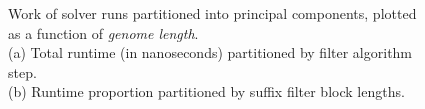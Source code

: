 \begin{figure}
\centering
{}
\caption[Work time of \aspop{} solver runs partitioned into principal components, plotted as a function of \textit{genome length}]{Work of \aspop{} solver runs partitioned into principal components, plotted as a function of \textit{genome length}.\\(a) Total runtime (in nanoseconds) partitioned by filter algorithm step.\\(b) Runtime proportion partitioned by suffix filter block lengths.}
\label{fig:gnmlen}
\end{figure}



